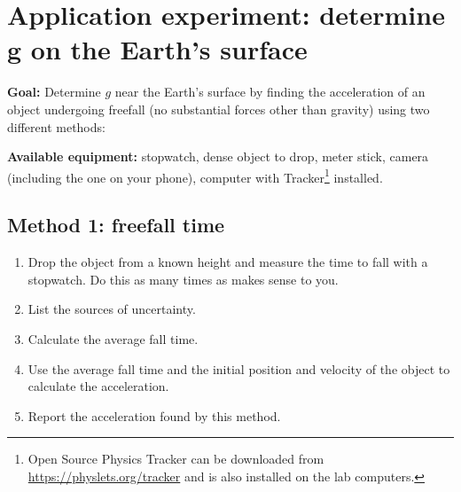\section{Application experiment: determine $\bm{g}$ on the Earth's surface}

\textbf{Goal:} Determine $g$ near the Earth's surface by finding the acceleration of an object undergoing freefall (no substantial forces other than gravity) using two different methods: 


\textbf{Available equipment:} stopwatch, dense object to drop, meter stick, camera (including the one on your phone), computer with Tracker\footnote{Open Source Physics Tracker can be downloaded from \url{https://physlets.org/tracker} and is also installed on the lab computers.} installed.

\subsection{Method 1: freefall time}

\begin{enumerate}
	\item Drop the object from a known height and measure the time to fall with a stopwatch. Do this as many times as makes sense to you.
	
	\item List the sources of uncertainty.%
	
	\item Calculate the average fall time.
	
	
	\item Use the average fall time and the initial position and velocity of the object to calculate the acceleration.
	
	
	\item Report the acceleration found by this method.%
\end{enumerate}

